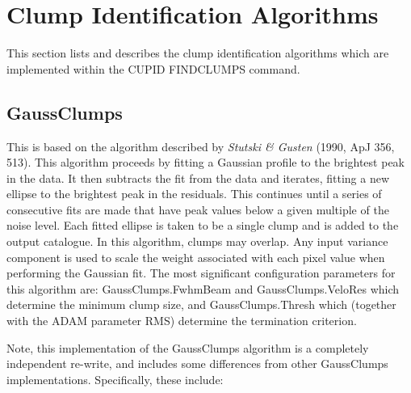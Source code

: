 \documentclass[twoside,11pt]{article}
\newcommand{\htmlref}[2]{#1}
\newcommand{\xlabel}[1]{}
\renewcommand{\_}{\texttt{\symbol{95}}}
\begin{document}
\section{Clump Identification Algorithms}
This section lists and describes the clump identification algorithms
which are implemented within the CUPID \htmlref{FINDCLUMPS}{FINDCLUMPS}
command.

\subsection{\xlabel{gaussclumps}GaussClumps}

This is based on the algorithm described by \emph{Stutski \& Gusten}
(1990, ApJ 356, 513). This algorithm proceeds by fitting a Gaussian
profile to the brightest peak in the data. It then subtracts the fit from
the data and iterates, fitting a new ellipse to the brightest peak in the
residuals. This continues until a series of consecutive fits are made
that have peak values below a given multiple of the noise level. Each
fitted ellipse is taken to be a single clump and is added to the output
catalogue. In this algorithm, clumps may overlap. Any input variance
component is used to scale the weight associated with each pixel value
when performing the Gaussian fit. The most significant configuration
parameters for this algorithm are: GaussClumps.FwhmBeam and
GaussClumps.VeloRes which determine the minimum clump size, and
GaussClumps.Thresh which (together with the ADAM parameter RMS) determine
the termination criterion.

Note, this implementation of the GaussClumps algorithm is a completely
independent re-write, and includes some differences from other
GaussClumps implementations. Specifically, these include:
\end{document}
